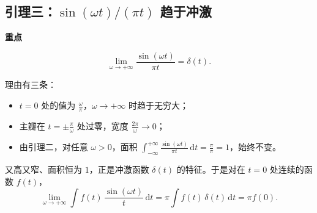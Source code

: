 \documentclass[UTF8,a4paper,11pt]{ctexart}
\newenvironment{remember}{\begin{rememberbox}\textbf{重点}\par\smallskip}{\end{rememberbox}}
\newcounter{ex}[section]
\begin{document}
\subsection{引理三：\texorpdfstring{$\sin(\omega t)/(\pi t)$}{sin(wt)/(pi t)} 趋于冲激}\label{sub:lemma3}
\begin{remember}
\[
\lim_{\omega\to+\infty}\frac{\sin(\omega t)}{\pi t}=\delta(t).
\]
\end{remember}
理由有三条：
\begin{itemize}[nosep]
\item $t=0$ 处的值为 $\frac{\omega}{\pi}$，$\omega\to+\infty$ 时趋于无穷大；
\item 主瓣在 $t=\pm\frac{\pi}{\omega}$ 处过零，宽度 $\frac{2\pi}{\omega}\to0$；
\item 由引理二，对任意 $\omega>0$，面积 $\int_{-\infty}^{+\infty}\frac{\sin(\omega t)}{\pi t}\,\mathrm{d}t=\frac{\pi}{\pi}=1$，始终不变。
\end{itemize}
又高又窄、面积恒为 $1$，正是冲激函数 $\delta(t)$ 的特征。于是对在 $t=0$ 处连续的函数 $f(t)$，
\[
\lim_{\omega\to+\infty}\int f(t)\,\frac{\sin(\omega t)}{t}\,\mathrm{d}t=\pi\int f(t)\,\delta(t)\,\mathrm{d}t=\pi f(0).
\]
\end{document}
